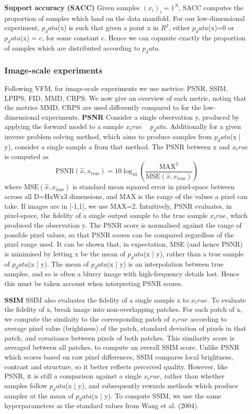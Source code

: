 \documentclass[12pt,a4paper]{report}
\begin{document}
\textbf{Support accuracy (SACC)}
Given samples $(x_i)_i=1^N$, SACC computes the proportion of samples which land on the data manifold. For our low-dimensional experiment, $p_data$(x) is such that given a point x in $R^2$, either $p_data$(x)=0 or $p_data$(x) = c, for some constant c. 
Hence we can copmute exactly the proportion of samples which are distributed according to $p_data$. 

\subsubsection{Image-scale experiments}
Following VFM, for image-scale experiments we use metrics: PSNR, SSIM, LPIPS, FID, MMD, CRPS. 
We now give an overview of each metric, noting that the metrics MMD, CRPS are used differently compared to for the low-dimensional experiments. 
\textbf{PSNR}
Consider a single observation y, produced by applying the forward model to a sample $x_true$ ~ $p_data$. 
Additionally for a given inverse problem solving method, which aims to produce samples from $p_data$(x | y), consider a single sample a from that method. 
The PSNR between x and $x_true$ is computed as 
\[
\text{PSNR}(\hat{x}, x_{\text{true}}) = 10 \log_{10} \left( \frac{\text{MAX}^2}{\text{MSE}(\hat{x}, x_{\text{true}})} \right)
\]
where $\text{MSE}(\hat{x}, x_{\text{true}})$ is standard mean squared error in pixel-space between across all D=HxWx3 dimensions, and MAX is the range of the values a pixel can take. If images are in [-1,1], we use MAX=2.  
Intuitively, PSNR evaluates, in pixel-space, the fidelity of a single output sample to the true sample $x_true$, which produced the observation y.  
The PSNR score is normalised against the range of possible pixel values, so that PSNR scores can be compared regardless of the pixel range used. 
It can be shown that, in expectation, MSE (and hence PSNR) is minimised by letting x be the mean of $p_data$(x | y), rather than a true sample of $p_data$(x | y). 
The mean of $p_data$(x | y) is an interpolation between true samples, and so is often a blurry image with high-frequency details lost. 
Hence this must be taken account when interpreting PSNR scores. 

\textbf{SSIM}
SSIM also evaluates the fidelity of a single sample x to $x_true$. 
To evaluate the fidelity of x, break image into non-overlapping patches. 
For each patch of x, we compute the similaity to the corresponding patch of $x_true$ according to average pixel value (brightness) of the patch, standard deviation of pixels in that patch, and covariance between pixels of both patches. 
This similarity score is averaged between all patches, to compute an overall SSIM score. 
Unlike PSNR which scores based on raw pixel differences, SSIM compares local brightness, contrast and structure, so it better reflects perceived quality. 
However, like PSNR, it is still a comparison against a single $x_true$, rather than whether samples follow $p_data$(x | y), and subsequently rewards methods which produce samples at the mean of $p_data$(x | y). 
To compute SSIM, we use the same hyperparameters as the standard values from Wang et al. (2004). 
\end{document}
